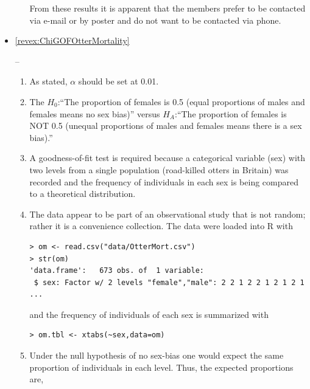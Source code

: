 \documentclass[10pt,openany]{book}\usepackage[]{graphicx}\usepackage[]{color}
\makeatletter
\newenvironment{kframe}{%
 \def\at@end@of@kframe{}%
 \ifinner\ifhmode%
  \def\at@end@of@kframe{\end{minipage}}%
  \begin{minipage}{\columnwidth}%
 \fi\fi%
 \def\FrameCommand##1{\hskip\@totalleftmargin \hskip-\fboxsep
 \colorbox{shadecolor}{##1}\hskip-\fboxsep
     \hskip-\linewidth \hskip-\@totalleftmargin \hskip\columnwidth}%
 \MakeFramed {\advance\hsize-\width
   \@totalleftmargin\z@ \linewidth\hsize
   \@setminipage}}%
 {\par\unskip\endMakeFramed%
 \at@end@of@kframe}
\newenvironment{knitrout}{}{} %
\makeatother
\begin{document}
\begin{itemize}
\begin{enumerate}
\begin{knitrout}
\begin{kframe}
\begin{verbatim}
\end{verbatim}
\end{kframe}
\end{knitrout}
From these results it is apparent that the members prefer to be contacted via e-mail or by poster and do not want to be contacted via phone.
  \end{enumerate}
  \item \hypertarget{ans:ChiGOFOtterMortality}{\ref{revex:ChiGOFOtterMortality}} --
    \begin{enumerate}
      \item As stated, $\alpha$ should be set at 0.01.
      \item The $H_{0}$:``The proportion of females is 0.5 (equal proportions of males and females means no sex bias)'' versus $H_{A}$:``The proportion of females is NOT 0.5 (unequal proportions of males and females means there is a sex bias).''
      \item A goodness-of-fit test is required because a categorical variable (sex) with two levels from a single population (road-killed otters in Britain) was recorded and the frequency of individuals in each sex is being compared to a theoretical distribution.
      \item The data appear to be part of an observational study that is not random; rather it is a convenience collection.  The data were loaded into R with
\begin{knitrout}
\color{fgcolor}\begin{kframe}
\begin{verbatim}
> om <- read.csv("data/OtterMort.csv")
> str(om)
'data.frame':	673 obs. of  1 variable:
 $ sex: Factor w/ 2 levels "female","male": 2 2 1 2 2 1 2 1 2 1 ...
\end{verbatim}
\end{kframe}
\end{knitrout}
and the frequency of individuals of each sex is summarized with
\begin{knitrout}
\color{fgcolor}\begin{kframe}
\begin{verbatim}
> om.tbl <- xtabs(~sex,data=om)
\end{verbatim}
\end{kframe}
\end{knitrout}
      \item Under the null hypothesis of no sex-bias one would expect the same proportion of individuals in each level.  Thus, the expected proportions are,

\end{enumerate}
\end{itemize}
\end{document}

